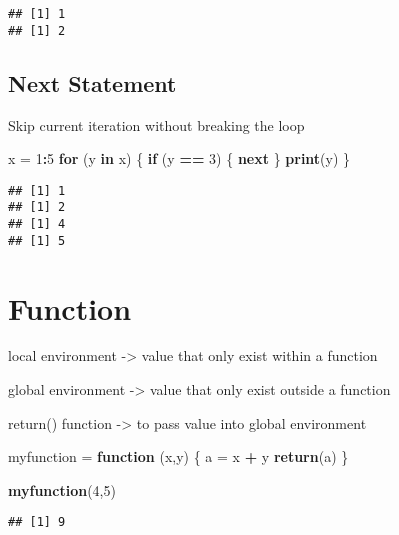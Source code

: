 \documentclass[
]{article}
\newenvironment{Shaded}{\begin{snugshade}}{\end{snugshade}}
\newcommand{\ControlFlowTok}[1]{\textcolor[rgb]{0.13,0.29,0.53}{\textbf{#1}}}
\newcommand{\DecValTok}[1]{\textcolor[rgb]{0.00,0.00,0.81}{#1}}
\newcommand{\FunctionTok}[1]{\textcolor[rgb]{0.13,0.29,0.53}{\textbf{#1}}}
\newcommand{\NormalTok}[1]{#1}
\newcommand{\OtherTok}[1]{\textcolor[rgb]{0.56,0.35,0.01}{#1}}
\newcommand{\SpecialCharTok}[1]{\textcolor[rgb]{0.81,0.36,0.00}{\textbf{#1}}}
\begin{document}
\begin{verbatim}
## [1] 1
## [1] 2
\end{verbatim}

\subsection{Next Statement}\label{next-statement}

Skip current iteration without breaking the loop

\begin{Shaded}
\begin{Highlighting}[]
\NormalTok{x }\OtherTok{=} \DecValTok{1}\SpecialCharTok{:}\DecValTok{5}
\ControlFlowTok{for}\NormalTok{ (y }\ControlFlowTok{in}\NormalTok{ x) \{}
  \ControlFlowTok{if}\NormalTok{ (y }\SpecialCharTok{==} \DecValTok{3}\NormalTok{) \{}
    \ControlFlowTok{next}
\NormalTok{  \}}
  \FunctionTok{print}\NormalTok{(y)}
\NormalTok{\}}
\end{Highlighting}
\end{Shaded}

\begin{verbatim}
## [1] 1
## [1] 2
## [1] 4
## [1] 5
\end{verbatim}

\section{Function}\label{function}

local environment -\textgreater{} value that only exist within a
function

global environment -\textgreater{} value that only exist outside a
function

return() function -\textgreater{} to pass value into global environment

\begin{Shaded}
\begin{Highlighting}[]
\NormalTok{myfunction }\OtherTok{=} \ControlFlowTok{function}\NormalTok{ (x,y) \{}
\NormalTok{  a }\OtherTok{=}\NormalTok{ x }\SpecialCharTok{+}\NormalTok{ y}
  \FunctionTok{return}\NormalTok{(a)}
\NormalTok{\}}

\FunctionTok{myfunction}\NormalTok{(}\DecValTok{4}\NormalTok{,}\DecValTok{5}\NormalTok{)}
\end{Highlighting}
\end{Shaded}

\begin{verbatim}
## [1] 9
\end{verbatim}
\end{document}
